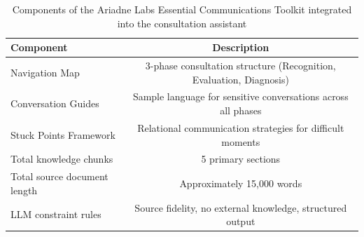 
\begin{table}[htbp]
\centering
\caption{Components of the Ariadne Labs Essential Communications Toolkit integrated into the consultation assistant}
\label{tab:framework_components}
\setlength{\tabcolsep}{8pt}
\begin{tabular}{l c}
\toprule
\textbf{Component} & \textbf{Description} \\
\midrule
Navigation Map & 3-phase consultation structure (Recognition, Evaluation, Diagnosis) \\
Conversation Guides & Sample language for sensitive conversations across all phases \\
Stuck Points Framework & Relational communication strategies for difficult moments \\
\midrule
Total knowledge chunks & 5 primary sections \\
Total source document length & Approximately 15,000 words \\
LLM constraint rules & Source fidelity, no external knowledge, structured output \\
\bottomrule
\end{tabular}
\end{table}
